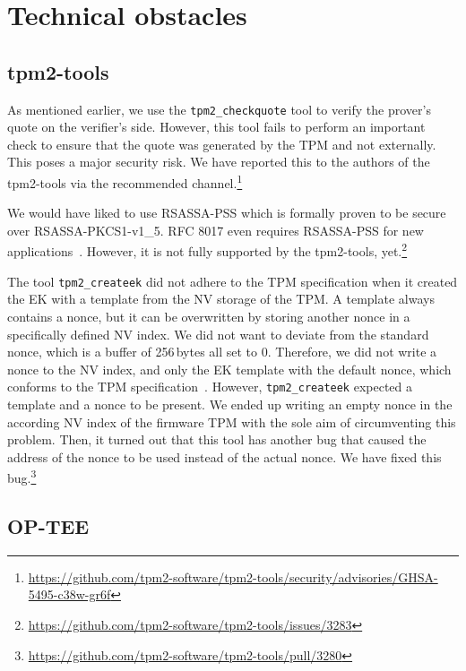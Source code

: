 \section{Technical obstacles}

\subsection{tpm2-tools}

As mentioned earlier, we use the \texttt{tpm2\_checkquote} tool to verify the prover's quote on the verifier's side.
However, this tool fails to perform an important check to ensure that the quote was generated by the TPM and not externally.
This poses a major security risk.
We have reported this to the authors of the tpm2-tools via the recommended channel.\footnote{\url{https://github.com/tpm2-software/tpm2-tools/security/advisories/GHSA-5495-c38w-gr6f}}

We would have liked to use RSASSA-PSS which is formally proven to be secure over RSASSA-PKCS1-v1\_5.
RFC 8017 even requires RSASSA-PSS for new applications~\cite{Moriarty2016}.
However, it is not fully supported by the tpm2-tools, yet.\footnote{\url{https://github.com/tpm2-software/tpm2-tools/issues/3283}}

The tool \texttt{tpm2\_createek} did not adhere to the TPM specification when it created the EK with a template from the NV storage of the TPM\@.
A template always contains a nonce, but it can be overwritten by storing another nonce in a specifically defined NV index.
We did not want to deviate from the standard nonce, which is a buffer of 256\,bytes all set to 0.
Therefore, we did not write a nonce to the NV index, and only the EK template with the default nonce, which conforms to the TPM specification~\cite{tcg-ek}.
However, \texttt{tpm2\_createek} expected a template and a nonce to be present.
We ended up writing an empty nonce in the according NV index of the firmware TPM with the sole aim of circumventing this problem.
Then, it turned out that this tool has another bug that caused the address of the nonce  to be used instead of the actual nonce.
We have fixed this bug.\footnote{\url{https://github.com/tpm2-software/tpm2-tools/pull/3280}}


\subsection{OP-TEE}

